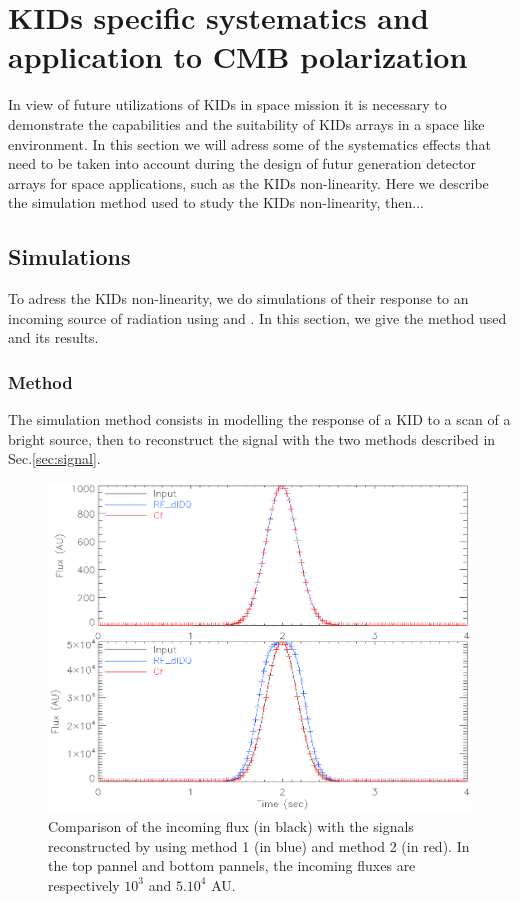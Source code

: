 
\section{KIDs specific systematics and application to CMB polarization}

In view of future utilizations of KIDs in space mission it is necessary to demonstrate the capabilities and the suitability of KIDs arrays in a space like environment. In this section we will adress some of the systematics effects that need to be taken into account during the design of futur generation detector arrays for space applications, such as the KIDs non-linearity. Here we describe the simulation method used to study the KIDs non-linearity, then...\\

\subsection{Simulations}
To adress the KIDs non-linearity, we do simulations of their response to an incoming source of radiation using \rf and \cf. In this section, we give the method used and its results.

	\subsubsection{Method}
	
The simulation method consists in modelling the response of a KID to a scan of a bright source, then to reconstruct the signal with the two methods described  in Sec.\ref{sec:signal}.

\begin{figure}[h]
\includegraphics[scale=0.54]{Figures/planets.eps}
\caption{Comparison of the incoming flux (in black) with the signals reconstructed by using method 1 (in blue) and method 2 (in red). In the top pannel and bottom pannels, the incoming fluxes are respectively $10^{3}$ and $5.10^{4}$ AU.}
\label{planet}
\end{figure}

